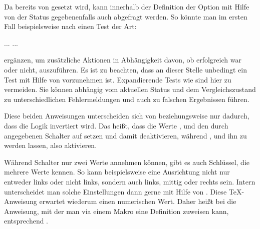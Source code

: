 \begin{Example}
  Da  bereits von 
  gesetzt wird, kann innerhalb der Definition der Option mit Hilfe von
   der Status gegebenenfalls auch
  abgefragt werden. So könnte man im ersten Fall beispielsweise nach
   einen Test der Art:
\begin{lstcode}
  \ifx\FamilyKeyState\FamilyKeyStateProcessed
      ...
  \else
      ...
  \fi
\end{lstcode}
  ergänzen, um zusätzliche Aktionen in Abhängigkeit davon, ob
   erfolgreich war oder nicht,
  auszuführen. Es ist zu beachten, dass an dieser Stelle
  unbedingt ein Test mit Hilfe von  vorzunehmen ist. Expandierende
  Tests wie  sind hier zu vermeiden. Sie können
  abhängig vom aktuellen Status und dem Vergleichszustand zu unterschiedlichen
  Fehlermeldungen und auch zu falschen Ergebnissen führen.%
\end{Example}%
\EndIndexGroup
\ExampleEndFix


\begin{Declaration}
\end{Declaration}%
Diese beiden Anweisungen unterscheiden
sich von  beziehungsweise
 nur dadurch, dass die Logik invertiert
wird. Das heißt, dass die Werte ,  und 
den durch  angegebenen Schalter auf  setzen
und damit deaktivieren, während ,  und 
ihn zu  werden lassen, also aktivieren.%
\EndIndexGroup

\begin{Declaration}
\end{Declaration}
Während Schalter nur zwei Werte annehmen können, gibt es auch Schlüssel, die
mehrere Werte kennen. So kann beispielsweise eine Ausrichtung nicht nur
entweder links oder nicht links, sondern auch links, mittig oder rechts
sein. Intern unterscheidet man solche Einstellungen dann gerne mit Hilfe von
. Diese \TeX-Anweisung erwartet wiederum einen
numerischen Wert. Daher heißt bei  die Anweisung, mit der
man via  einem Makro eine Definition zuweisen kann,
entsprechend .

